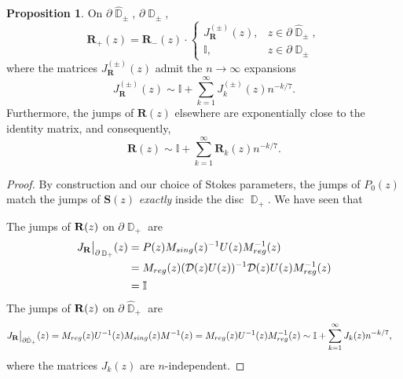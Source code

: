 \documentclass[usenames,dvipsnames]{article}
\theoremstyle{definition}
\newtheorem{prop}{Proposition}[section]
\DeclareMathOperator{\DD}{\mathbb{D}}
\numberwithin{equation}{section}
\numberwithin{figure}{section}
\begin{document}
    \begin{prop}
         On $\partial \hat{\DD}_{\pm}$, $\partial \DD_{\pm}$,
            \begin{equation}
                \boldsymbol{R}_+(z) = \boldsymbol{R}_-(z)\cdot
                \begin{cases}
                    J_{\boldsymbol{R}}^{(\pm)}(z), & z\in\partial \hat{\DD}_{\pm},\\
                    \mathbb{I}, & z\in\partial \DD_{\pm}
                \end{cases}
            \end{equation}
        where the matrices $J_{\boldsymbol{R}}^{(\pm)}(z)$ admit the $n\to \infty$ expansions
            \begin{equation}
                J_{\boldsymbol{R}}^{(\pm)}(z) \sim \mathbb{I} + \sum_{k=1}^{\infty} J_k^{(\pm)}(z)n^{-k/7}.
            \end{equation}
        Furthermore, the jumps of $\boldsymbol{R}(z)$ elsewhere are exponentially close to the identity matrix, and consequently,
            \begin{equation}
                \boldsymbol{R}(z) \sim \mathbb{I} + \sum_{k=1}^{\infty} \boldsymbol{R}_{k}(z) n^{-k/7}.
            \end{equation}
    \end{prop}
\begin{proof}
    By construction and our choice of Stokes parameters, the jumps of $P_0(z)$ match the jumps of $\boldsymbol{S}(z)$ \textit{exactly} inside the
    disc $\DD_+$. We have seen that
    
    The jumps of ${\bf R}(z)$ on $\partial \DD_+$ are
    \begin{align*}
        J_{\bf R}\big|_{\partial \DD_+}(z) &= P(z) M_{sing}(z)^{-1}U(z)M_{reg}^{-1}(z)\\
        &=M_{reg}(z)(\mathcal{D}(z)U(z))^{-1}\mathcal{D}(z)U(z)M_{reg}^{-1}(z)\\
        &=\mathbb{I}
    \end{align*}
The jumps of ${\bf R}(z)$ on $\partial \hat{\DD}_+$ are
    \begin{align*}
        J_{\bf R}\big|_{\partial \hat{\DD}_+}(z) &= M_{reg}(z)U^{-1}(z)M_{sing}(z)M^{-1}(z) = M_{reg}(z)U^{-1}(z)M_{reg}^{-1}(z) \sim \mathbb{I} + \sum_{k=1}^{\infty} J_k(z) n^{-k/7},
    \end{align*}
where the matrices $J_k(z)$ are $n$-independent.
\end{proof}
\end{document}
